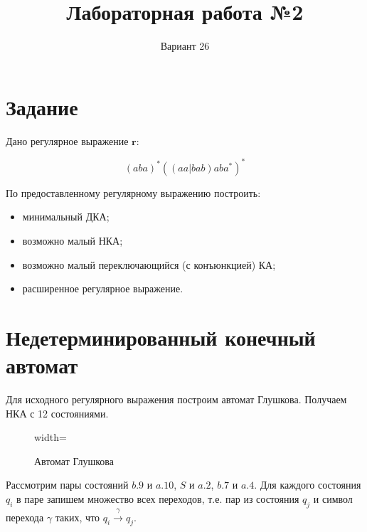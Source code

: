 \documentclass[a4paper, 12pt]{article}
\title{Лабораторная работа №2}
\author{Вариант 26}
\newcommand{\re}{\mathbf{r}}
\begin{document}
    \maketitle
    \tableofcontents
    \newpage

    \section{Задание}

    Дано регулярное выражение $\re$:

    \[
       (aba)^{*}((aa | bab)aba^{*})^{*}
    \]

    По предоставленному регулярному выражению построить:

    \begin{itemize}
        \itemsep -0.8pt
        \item[---] минимальный ДКА;
        \item[---] возможно малый НКА;
        \item[---] возможно малый переключающийся (с конъюнкцией) КА;
        \item[---] расширенное регулярное выражение.
    \end{itemize}

    \section{Недетерминированный конечный автомат}

    Для исходного регулярного выражения построим автомат Глушкова. Получаем НКА с 12 состояниями.


    \begin{figure}[H]
      \centering
      \begin{adjustbox}{width=\textwidth}
      
      \end{adjustbox}
      \caption{Автомат Глушкова}
      \label{fig:nfa:glushkov}
    \end{figure}

    Рассмотрим пары состояний $b.9$ и $a.10$, $S$ и $a.2$, $b.7$ и $a.4$. Для каждого состояния $q_i$ в паре запишем множество всех переходов, т.е. пар из состояния $q_j$ и символ перехода $\gamma$ таких, что $q_i \xrightarrow{\gamma} q_j$.

\end{document}
